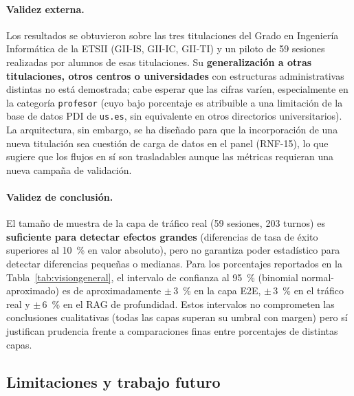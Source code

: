 \paragraph{Validez externa.} Los resultados se obtuvieron sobre las tres titulaciones del Grado en Ingeniería Informática de la ETSII (GII-IS, GII-IC, GII-TI) y un piloto de 59 sesiones realizadas por alumnos de esas titulaciones. Su \textbf{generalización a otras titulaciones, otros centros o universidades} con estructuras administrativas distintas no está demostrada; cabe esperar que las cifras varíen, especialmente en la categoría \texttt{profesor} (cuyo bajo porcentaje es atribuible a una limitación de la base de datos PDI de \texttt{us.es}, sin equivalente en otros directorios universitarios). La arquitectura, sin embargo, se ha diseñado para que la incorporación de una nueva titulación sea cuestión de carga de datos en el panel (RNF-15), lo que sugiere que los flujos en sí son trasladables aunque las métricas requieran una nueva campaña de validación.

\paragraph{Validez de conclusión.} El tamaño de muestra de la capa de tráfico real (59 sesiones, 203 turnos) es \textbf{suficiente para detectar efectos grandes} (diferencias de tasa de éxito superiores al 10~\% en valor absoluto), pero no garantiza poder estadístico para detectar diferencias pequeñas o medianas. Para los porcentajes reportados en la Tabla~\ref{tab:visiongeneral}, el intervalo de confianza al 95~\% (binomial normal-aproximado) es de aproximadamente $\pm$\,3~\% en la capa E2E, $\pm$\,3~\% en el tráfico real y $\pm$\,6~\% en el RAG de profundidad. Estos intervalos no comprometen las conclusiones cualitativas (todas las capas superan su umbral con margen) pero sí justifican prudencia frente a comparaciones finas entre porcentajes de distintas capas.

\subsection{Limitaciones y trabajo futuro}\label{subsec:pruebas-limitaciones}

